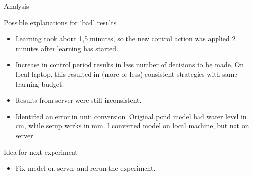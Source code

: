 \documentclass[notheorems,aspectratio=169]{beamer}
\begin{document}
\begin{frame}{Analysis}
	\begin{block}{Possible explanations for `bad' results}
		\begin{itemize}
			\item Learning took about 1,5 minutes, so the new control action was applied 2 minutes after learning has started.
			\item Increase in control period results in less number of decisions to be made. On local laptop, this resulted in (more or less) consistent strategies with same learning budget.
			\item Results from server were still inconsistent.
			\item Identified an error in unit conversion. Original pond model had water level in cm, while setup works in mm. I converted model on local machine, but not on server.
		\end{itemize}
	\end{block}
	
	\begin{block}{Idea for next experiment}
		\begin{itemize}
			\item Fix model on server and rerun the experiment.
		\end{itemize}
	\end{block}
\end{frame}
\end{document}
